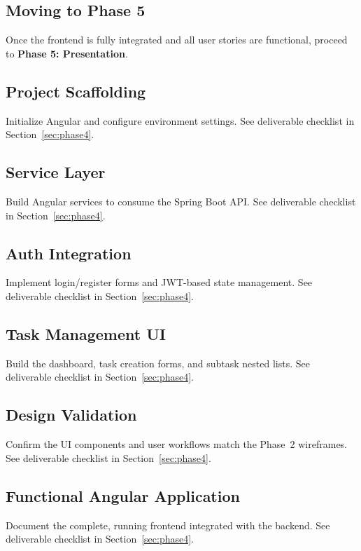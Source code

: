 \subsection{Moving to Phase 5}
Once the frontend is fully integrated and all user stories are functional,
proceed to \textbf{Phase 5: Presentation}.

\newpage
\subsection{Project Scaffolding}\label{sec:fe-scaffolding}
Initialize Angular and configure environment settings.
See deliverable checklist in Section~\ref{sec:phase4}.

\newpage
\subsection{Service Layer}\label{sec:service-layer}
Build Angular services to consume the Spring Boot API.
See deliverable checklist in Section~\ref{sec:phase4}.

\newpage
\subsection{Auth Integration}\label{sec:auth-integration}
Implement login/register forms and JWT-based state management.
See deliverable checklist in Section~\ref{sec:phase4}.

\newpage
\subsection{Task Management UI}\label{sec:task-ui}
Build the dashboard, task creation forms, and subtask nested lists.
See deliverable checklist in Section~\ref{sec:phase4}.

\newpage
\subsection{Design Validation}\label{sec:fe-design-validation}
Confirm the UI components and user workflows match the Phase~2 wireframes.
See deliverable checklist in Section~\ref{sec:phase4}.

\newpage
\subsection{Functional Angular Application}\label{sec:functional-angular}
Document the complete, running frontend integrated with the backend.
See deliverable checklist in Section~\ref{sec:phase4}.

